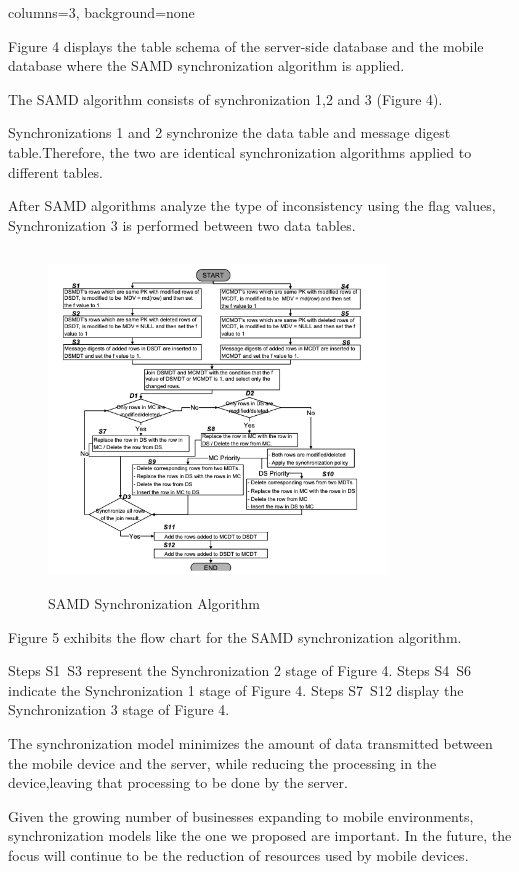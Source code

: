 \documentclass[portrait, paperwidth=91cm, paperheight=121cm, fontscale=0.35]{baposter}
\begin{document}
\begin{poster}{columns=3, background=none}
{Figure 4 displays the table schema of the server-side database
and the mobile database where the SAMD synchronization
algorithm is applied. 

The SAMD algorithm consists of synchronization 1,2 and 3 (Figure 4). 

Synchronizations 1 and 2 synchronize the data table and message digest table.Therefore, the two are identical synchronization algorithms applied to different tables. 

After SAMD algorithms analyze the type of inconsistency using the flag values, Synchronization 3 is performed between two data tables.

    \begin{figure}[H]
    \centering
    \includegraphics[height=9cm, width=9cm]{flowchart.png}
    \caption{SAMD Synchronization Algorithm}\label{flowchart}
    \end{figure}

Figure 5 exhibits the flow chart for the SAMD synchronization algorithm. 

Steps S1~S3 represent the Synchronization 2 stage of Figure 4.
Steps S4~S6 indicate the Synchronization 1 stage of Figure 4.
Steps S7~S12 display the Synchronization 3 stage of Figure 4.
}

{The synchronization model minimizes the amount of data transmitted between the mobile device and the server, while reducing the processing in the device,leaving that processing to be done by the server.}

{
 Given the growing number of businesses expanding to mobile environments, synchronization models like the one we proposed are important. In the future, the focus will continue to be the reduction of resources used by mobile devices. }

{
\nocite{*}




}
\end{poster}
\end{document}

